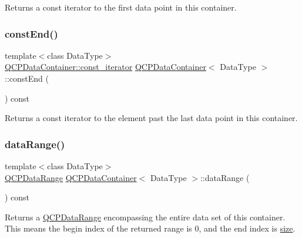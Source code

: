Returns a const iterator to the first data point in this container. \mbox{\label{class_q_c_p_data_container_aa7f7cf239b85b1a28de3d675cc5b3da1}} 
\subsubsection{\texorpdfstring{const\+End()}{constEnd()}}
{\footnotesize\ttfamily template$<$class Data\+Type$>$ \\
\hyperlink{class_q_c_p_data_container_ae40a91f5cb0bcac61d727427449b7d15}{Q\+C\+P\+Data\+Container\+::const\+\_\+iterator} \hyperlink{class_q_c_p_data_container}{Q\+C\+P\+Data\+Container}$<$ Data\+Type $>$\+::const\+End (\begin{DoxyParamCaption}{ }\end{DoxyParamCaption}) const\hspace{0.3cm}{\ttfamily [inline]}}

Returns a const iterator to the element past the last data point in this container. \mbox{\label{class_q_c_p_data_container_aece90eeb2ba8d3c46d3d94023630fbc7}} 
\subsubsection{\texorpdfstring{data\+Range()}{dataRange()}}
{\footnotesize\ttfamily template$<$class Data\+Type$>$ \\
\hyperlink{class_q_c_p_data_range}{Q\+C\+P\+Data\+Range} \hyperlink{class_q_c_p_data_container}{Q\+C\+P\+Data\+Container}$<$ Data\+Type $>$\+::data\+Range (\begin{DoxyParamCaption}{ }\end{DoxyParamCaption}) const\hspace{0.3cm}{\ttfamily [inline]}}

Returns a \hyperlink{class_q_c_p_data_range}{Q\+C\+P\+Data\+Range} encompassing the entire data set of this container. This means the begin index of the returned range is 0, and the end index is \hyperlink{class_q_c_p_data_container_a8e9b262c739672e13472d0d45b720258}{size}. \mbox{\label{class_q_c_p_data_container_acf66dfad83fe041380f5e0491e7676f2}} 

